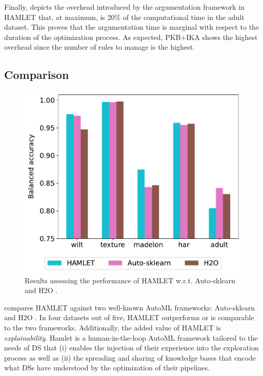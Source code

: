 Finally,  depicts the overhead introduced by the argumentation framework in HAMLET that, at maximum, is 20\% of the computational time in the adult dataset.
This proves that the argumentation time is marginal with respect to the duration of the optimization process.
As expected, PKB+IKA shows the highest overhead since the number of rules to manage is the highest.

\subsection{Comparison}

\begin{figure}[t]
    \centering
    \includegraphics[scale=.45]{chapters/human-centric/hamlet/img/comparison.pdf}
    \caption{Results assessing the performance of HAMLET w.r.t. Auto-sklearn \cite{feurer2019auto} and H2O \cite{ledell2020h2o}.}
    \label{fig:comparison}
\end{figure}


 compares HAMLET against two well-known AutoML frameworks: Auto-sklearn \cite{feurer2019auto} and H2O \cite{ledell2020h2o}.
In four datasets out of five, HAMLET outperforms or is comparable to the two frameworks.
Additionally, the added value of HAMLET is \textit{explainability}.
Hamlet is a human-in-the-loop AutoML framework tailored to the needs of DS that (i) enables the injection of their experience into the exploration process as well as (ii) the spreading and sharing of knowledge bases that encode what DSs have understood by the optimization of their pipelines.


